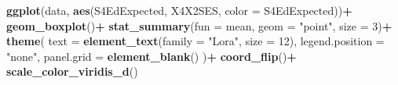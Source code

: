 \documentclass[11pt,]{article}
\newenvironment{Shaded}{\begin{snugshade}}{\end{snugshade}}
\newcommand{\DataTypeTok}[1]{\textcolor[rgb]{0.13,0.29,0.53}{#1}}
\newcommand{\DecValTok}[1]{\textcolor[rgb]{0.00,0.00,0.81}{#1}}
\newcommand{\KeywordTok}[1]{\textcolor[rgb]{0.13,0.29,0.53}{\textbf{#1}}}
\newcommand{\NormalTok}[1]{#1}
\newcommand{\OperatorTok}[1]{\textcolor[rgb]{0.81,0.36,0.00}{\textbf{#1}}}
\newcommand{\StringTok}[1]{\textcolor[rgb]{0.31,0.60,0.02}{#1}}
\begin{document}
\begin{Shaded}
\begin{Highlighting}[]
\KeywordTok{ggplot}\NormalTok{(data, }\KeywordTok{aes}\NormalTok{(S4EdExpected, X4X2SES, }\DataTypeTok{color =}\NormalTok{ S4EdExpected))}\OperatorTok{+}
\StringTok{  }\KeywordTok{geom_boxplot}\NormalTok{()}\OperatorTok{+}
\StringTok{  }\KeywordTok{stat_summary}\NormalTok{(}\DataTypeTok{fun =}\NormalTok{ mean, }\DataTypeTok{geom =} \StringTok{"point"}\NormalTok{, }\DataTypeTok{size =} \DecValTok{3}\NormalTok{)}\OperatorTok{+}
\StringTok{  }\KeywordTok{theme}\NormalTok{(}
    \DataTypeTok{text =} \KeywordTok{element_text}\NormalTok{(}\DataTypeTok{family =} \StringTok{"Lora"}\NormalTok{, }\DataTypeTok{size =} \DecValTok{12}\NormalTok{),}
    \DataTypeTok{legend.position =} \StringTok{"none"}\NormalTok{,}
    \DataTypeTok{panel.grid =} \KeywordTok{element_blank}\NormalTok{()}
\NormalTok{  )}\OperatorTok{+}
\StringTok{  }\KeywordTok{coord_flip}\NormalTok{()}\OperatorTok{+}
\StringTok{  }\KeywordTok{scale_color_viridis_d}\NormalTok{()}
\end{Highlighting}
\end{Shaded}
\newpage
\singlespacing 

\end{document}
